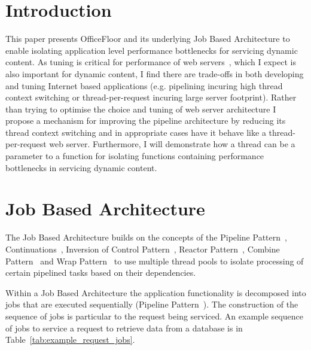 \documentclass[conference]{ieee/IEEEtran}
\begin{document}
%
\IEEEpeerreviewmaketitle



\section{Introduction}
This paper presents OfficeFloor and its underlying Job Based Architecture to
enable isolating application level performance bottlenecks for servicing dynamic
content. As tuning is critical for performance of web
servers~\cite{tuning-important,tuning-os-important}, which I expect is also
important for dynamic content, I find there are trade-offs in both developing
and tuning Internet based applications (e.g. pipelining incuring high thread
context switching or thread-per-request incuring large server footprint).
Rather than trying to optimise the choice and tuning of web server architecture
I propose a mechanism for improving the pipeline architecture by reducing its
thread context switching and in appropriate cases have it behave like a
thread-per-request web server.  Furthermore, I will demonstrate how a thread can
be a parameter to a function for isolating functions containing performance
bottlenecks in servicing dynamic content.


\section{Job Based Architecture}
The Job Based Architecture builds on the concepts of the Pipeline
Pattern~\cite{pipeline}, Continuations~\cite{continuations}, Inversion of
Control Pattern~\cite{ioc}, Reactor Pattern~\cite{reactor}, Combine
Pattern~\cite{pipeline} and Wrap Pattern~\cite{pipeline} to use multiple thread
pools to isolate processing of certain pipelined tasks based on their
dependencies.

Within a Job Based Architecture the application functionality is decomposed into
jobs that are executed sequentially (Pipeline Pattern~\cite{pipeline}).  The
construction of the sequence of jobs is particular to the request being
serviced.  An example sequence of jobs to service a request to retrieve data
from a database is in Table~\ref{tab:example_request_jobs}.
\end{document}
